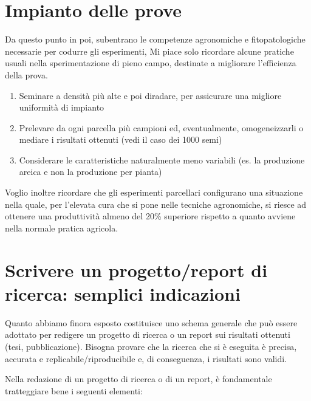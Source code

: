 \documentclass[a4paper,12pt,oneside]{book}
\providecommand{\tightlist}{%
  \setlength{\itemsep}{0pt}\setlength{\parskip}{0pt}}
\theoremstyle{definition}
\theoremstyle{definition}
\theoremstyle{definition}
\theoremstyle{remark}
\begin{document}
\section{Impianto delle prove}\label{impianto-delle-prove}

Da questo punto in poi, subentrano le competenze agronomiche e
fitopatologiche necessarie per codurre gli esperimenti, Mi piace solo
ricordare alcune pratiche usuali nella sperimentazione di pieno campo,
destinate a migliorare l'efficienza della prova.

\begin{enumerate}
\def\labelenumi{\arabic{enumi}.}
\tightlist
\item
  Seminare a densità più alte e poi diradare, per assicurare una
  migliore uniformità di impianto
\item
  Prelevare da ogni parcella più campioni ed, eventualmente,
  omogeneizzarli o mediare i risultati ottenuti (vedi il caso dei 1000
  semi)
\item
  Considerare le caratteristiche naturalmente meno variabili (es. la
  produzione areica e non la produzione per pianta)
\end{enumerate}

Voglio inoltre ricordare che gli esperimenti parcellari configurano una
situazione nella quale, per l'elevata cura che si pone nelle tecniche
agronomiche, si riesce ad ottenere una produttività almeno del 20\%
superiore rispetto a quanto avviene nella normale pratica agricola.

\section{Scrivere un progetto/report di ricerca: semplici
indicazioni}\label{scrivere-un-progettoreport-di-ricerca-semplici-indicazioni}

Quanto abbiamo finora esposto costituisce uno schema generale che può
essere adottato per redigere un progetto di ricerca o un report sui
risultati ottenuti (tesi, pubblicazione). Bisogna provare che la ricerca
che si è eseguita è precisa, accurata e replicabile/riproducibile e, di
conseguenza, i risultati sono validi.

Nella redazione di un progetto di ricerca o di un report, è fondamentale
tratteggiare bene i seguenti elementi:
\end{document}
